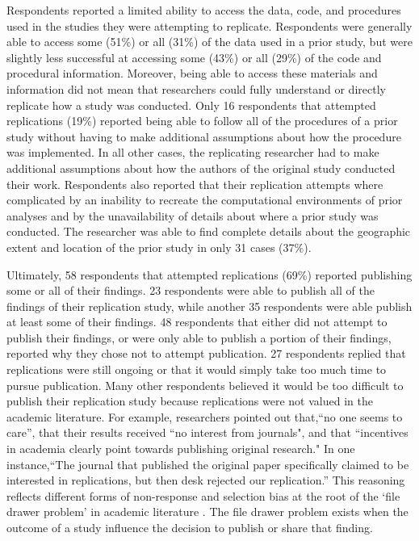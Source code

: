 \documentclass[]{interact}
\theoremstyle{plain}%
\theoremstyle{definition}
\theoremstyle{remark}
\begin{document}
Respondents reported a limited ability to access the data, code, and procedures used in the studies they were attempting to replicate. 
Respondents were generally able to access some (51\%) or all (31\%) of the data used in a prior study, but were slightly less successful at accessing some (43\%) or all (29\%) of the code and procedural information.
Moreover, being able to access these materials and information did not mean that researchers could fully understand or directly replicate how a study was conducted.
Only 16 respondents that attempted replications (19\%) reported being able to follow all of the procedures of a prior study without having to make additional assumptions about how the procedure was implemented. 
In all other cases, the replicating researcher had to make additional assumptions about how the authors of the original study conducted their work.
Respondents also reported that their replication attempts where complicated by an inability to recreate the computational environments of prior analyses and by the unavailability of details about where a prior study was conducted.
The researcher was able to find complete details about the geographic extent and location of the prior study in only 31 cases (37\%).

Ultimately, 58 respondents that attempted replications (69\%) reported publishing some or all of their findings.
23 respondents were able to publish all of the findings of their replication study, while another 35 respondents were able publish at least some of their findings.
48 respondents that either did not attempt to publish their findings, or were only able to publish a portion of their findings, reported why they chose not to attempt publication. 
27 respondents replied that replications were still ongoing or that it would simply take too much time to pursue publication. 
Many other respondents believed it would be too difficult to publish their replication study because replications were not valued in the academic literature.
For example, researchers pointed out that,``no one seems to care'', that their results received ``no interest from journals", and that ``incentives in academia clearly point towards publishing original research."
In one instance,``The journal that published the original paper specifically claimed to be interested in replications, but then desk rejected our replication.''
This reasoning reflects different forms of non-response and selection bias at the root of the `file drawer problem' in academic literature \citep{rosenthal1979}. 
The file drawer problem exists when the outcome of a study influence the decision to publish or share that finding. 
\end{document}

